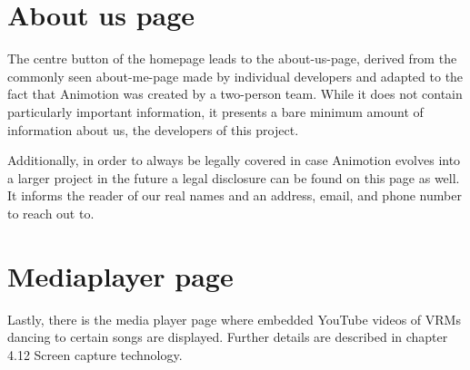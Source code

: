 \section{About us page}
The centre button of the homepage leads to the about-us-page, derived from the commonly seen about-me-page
made by individual developers and adapted to the fact that Animotion was created by a two-person team. While
it does not contain particularly important information, it presents a bare minimum amount of information
about us, the developers of this project.

Additionally, in order to always be legally covered in case Animotion evolves into a larger project in the
future a legal disclosure can be found on this page as well. It informs the reader of our real names and an
address, email, and phone number to reach out to.

\section{Mediaplayer page}
Lastly, there is the media player page where embedded YouTube videos of VRMs dancing to certain songs are displayed. Further details are described in chapter
4.12 Screen capture technology.


